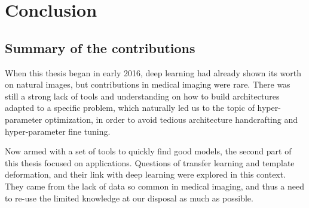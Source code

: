 \chapter{Conclusion}
\label{chap:conclusion}

\section{Summary of the contributions}

When this thesis began in early 2016, deep learning had already shown its worth on natural images, but contributions in medical imaging were rare. There was still a strong lack of tools and understanding on how to build architectures adapted to a specific problem, which naturally led us to the topic of hyper-parameter optimization, in order to avoid tedious architecture handcrafting and hyper-parameter fine tuning. 

Now armed with a set of tools to quickly find good models, the second part of this thesis focused on applications. Questions of transfer learning and template deformation, and their link with deep learning were explored in this context. They came from the lack of data so common in medical imaging, and thus a need to re-use the limited knowledge at our disposal as much as possible. 

